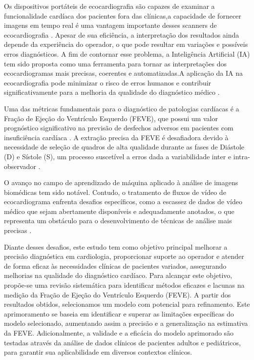 Os dispositivos portáteis de ecocardiografia são capazes de examinar a funcionalidade cardíaca dos pacientes fora das clínicas,a capacidade de fornecer imagens em tempo real é uma vantagem importante desses scanners de ecocardiografia \cite{Xiao}. Apesar de sua eficiência, a interpretação dos resultados ainda depende da experiência  do operador, o que pode resultar em variações e possíveis erros diagnósticos. A fim de contornar esse problema, a Inteligência Artificial (IA) tem sido proposta como uma ferramenta para tornar as interpretações dos ecocardiogramas mais precisas, coerentes e automatizadas.A aplicação da IA na ecocardiografia pode minimizar o risco de erros humanos e contribuir significativamente para a melhoria da qualidade do diagnóstico médico \cite{Alsharqi2018}.

Uma das métricas fundamentais para o diagnóstico de patologias cardíacas é a Fração de Ejeção do Ventrículo Esquerdo (FEVE), que possui um valor prognóstico significativo na previsão de desfechos adversos em pacientes com insuficiência cardíaca \cite{kosaraju_grigorova_goyal_makaryus}. A extração precisa da FEVE é desafiadora devido à necessidade de seleção de quadros de alta qualidade durante as fases de Diástole (D) e Sístole (S), um processo suscetível a erros dada a variabilidade inter e intra-observador \cite{Ouyang2020}.

O avanço no campo de aprendizado de máquina aplicado à análise de imagens biomédicas tem sido notável. Contudo, o tratamento de fluxos de vídeo de ecocardiograma enfrenta desafios específicos, como a escassez de dados de vídeo médico que sejam abertamente disponíveis e adequadamente anotados, o que representa um obstáculo para o desenvolvimento de técnicas de análise mais precisas \cite{Ouyang2020}.

Diante desses desafios, este estudo tem como objetivo principal melhorar a precisão diagnóstica em cardiologia, proporcionar suporte ao operador e atender de forma eficaz às necessidades clínicas de pacientes variados, assegurando melhorias na qualidade do diagnóstico cardíaco. Para alcançar este objetivo, propõe-se uma revisão sistemática para identificar métodos eficazes e lacunas na medição da Fração de Ejeção do Ventrículo Esquerdo (FEVE). A partir dos resultados obtidos, selecionamos um modelo com potencial para refinamento. Este aprimoramento se baseia em identificar e superar as limitações específicas do modelo selecionado, aumentando assim a precisão e a generalização na estimativa da FEVE. Adicionalmente, a validade e a eficácia do modelo aprimorado são testadas através da análise de dados clínicos de pacientes adultos e pediátricos, para garantir sua aplicabilidade em diversos contextos clínicos.

